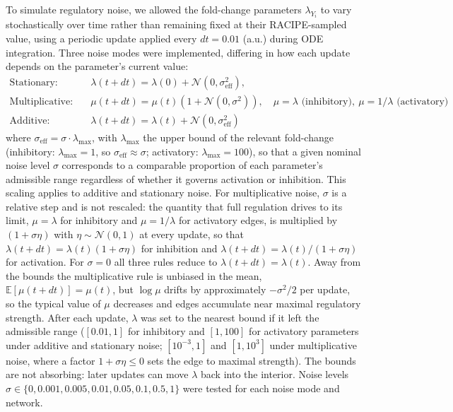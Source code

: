 \documentclass[11pt]{article}
\begin{document}
To simulate regulatory noise, we allowed the fold-change parameters $\lambda_{Y_i}$ to vary stochastically over time rather than remaining fixed at their RACIPE-sampled value, using a periodic update applied every $dt = 0.01$ (a.u.) during ODE integration. Three noise modes were implemented, differing in how each update depends on the parameter's current value:
\begin{align}
\text{Stationary:} \quad & \lambda(t+dt) = \lambda(0) + \mathcal{N}(0, \sigma_{\text{eff}}^2),\\
\text{Multiplicative:} \quad & \mu(t+dt) = \mu(t)\left(1 + \mathcal{N}(0, \sigma^2)\right), \quad \mu = \lambda \text{ (inhibitory)},\ \mu = 1/\lambda \text{ (activatory)}\\
\text{Additive:} \quad & \lambda(t+dt) = \lambda(t) + \mathcal{N}(0, \sigma_{\text{eff}}^2)
\end{align}
where $\sigma_{\text{eff}} = \sigma \cdot \lambda_{\max}$, with $\lambda_{\max}$ the upper bound of the relevant fold-change (inhibitory: $\lambda_{\max} = 1$, so $\sigma_{\text{eff}} \approx \sigma$; activatory: $\lambda_{\max} = 100$), so that a given nominal noise level $\sigma$ corresponds to a comparable proportion of each parameter's admissible range regardless of whether it governs activation or inhibition.  This scaling applies to additive and stationary noise. For multiplicative noise, $\sigma$ is a relative step and is not rescaled: the quantity that full regulation drives to its limit, $\mu = \lambda$ for inhibitory and $\mu = 1/\lambda$ for activatory edges, is multiplied by $(1 + \sigma\eta)$ with $\eta \sim \mathcal{N}(0,1)$ at every update, so that $\lambda(t+dt) = \lambda(t)(1+\sigma\eta)$ for inhibition and $\lambda(t+dt) = \lambda(t)/(1+\sigma\eta)$ for activation. For $\sigma = 0$ all three rules reduce to $\lambda(t+dt) = \lambda(t)$. Away from the bounds the multiplicative rule is unbiased in the mean, $\mathbb{E}[\mu(t+dt)] = \mu(t)$, but $\log\mu$ drifts by approximately $-\sigma^2/2$ per update, so the typical value of $\mu$ decreases and edges accumulate near maximal regulatory strength. After each update, $\lambda$ was set to the nearest bound if it left the admissible range ($[0.01, 1]$ for inhibitory and $[1, 100]$ for activatory parameters under additive and stationary noise; $[10^{-3}, 1]$ and $[1, 10^{3}]$ under multiplicative noise, where a factor $1+\sigma\eta \le 0$ sets the edge to maximal strength). The bounds are not absorbing: later updates can move $\lambda$ back into the interior. Noise levels $\sigma \in \{0, 0.001, 0.005, 0.01, 0.05, 0.1, 0.5, 1\}$ were tested for each noise mode and network.
\end{document}
